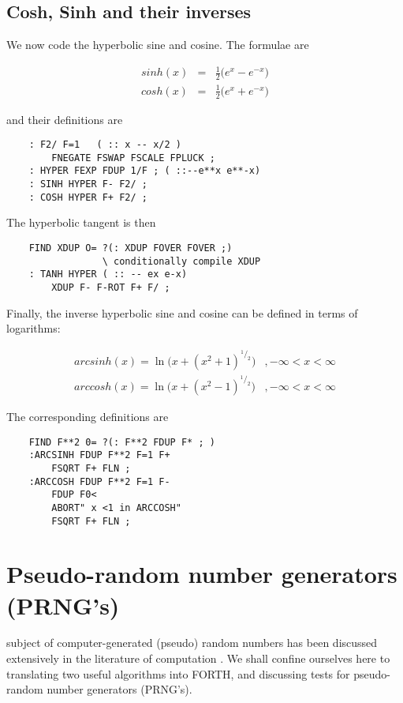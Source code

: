 \subsection{Cosh, Sinh and their inverses}
We now code the hyperbolic sine and cosine. The formulae are

\begin{eqnarray*}
    sinh(x) & = & \frac{1}{2}\Big(e^x-e^{-x}\Big)\label{hyp_eqn} \\
    cosh(x) & = & \frac{1}{2}\Big(e^x+e^{-x}\Big) 
\end{eqnarray*}

and their definitions are
\begin{verbatim}
    : F2/ F=1   ( :: x -- x/2 ) 
        FNEGATE FSWAP FSCALE FPLUCK ;
    : HYPER FEXP FDUP 1/F ; ( ::--e**x e**-x)
    : SINH HYPER F- F2/ ;
    : COSH HYPER F+ F2/ ;
\end{verbatim}

The hyperbolic tangent is then

\begin{verbatim}
    FIND XDUP O= ?(: XDUP FOVER FOVER ;)
                 \ conditionally compile XDUP
    : TANH HYPER ( :: -- ex e-x)
        XDUP F- F-ROT F+ F/ ;
\end{verbatim}

Finally, the inverse hyperbolic sine and cosine can be defined in
terms of logarithms:

\begin{eqnarray*}
    arcsinh(x) = \ln{\big(x + (x^2 + 1)^{^1/_2}\big)}  &, -\infty < x < \infty \\
    arccosh(x) = \ln{\big(x + (x^2 - 1)^{^1/_2}\big)}  &, -\infty < x < \infty 
\end{eqnarray*}

The corresponding definitions are 


\begin{verbatim}
    FIND F**2 0= ?(: F**2 FDUP F* ; )
    :ARCSINH FDUP F**2 F=1 F+
        FSQRT F+ FLN ;
    :ARCCOSH FDUP F**2 F=1 F-
        FDUP F0<
        ABORT" x <1 in ARCCOSH"
        FSQRT F+ FLN ;
\end{verbatim}




\section{Pseudo-random number generators (PRNG's)}
 subject of computer-generated (pseudo) random numbers
has been discussed extensively in the literature of computation 
  . We shall
confine ourselves here to translating two useful
algorithms into FORTH, and discussing tests for pseudo-random
number generators (PRNG's).

